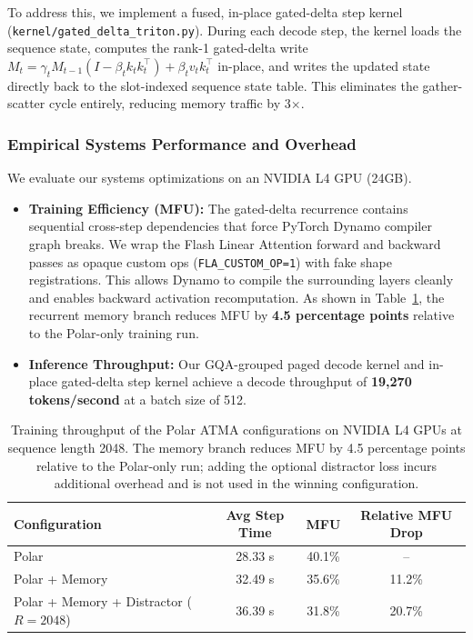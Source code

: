 \documentclass{article} %
\begin{document}
To address this, we implement a fused, in-place gated-delta step kernel (\texttt{kernel/gated\_delta\_triton.py}). During each decode step, the kernel loads the sequence state, computes the rank-1 gated-delta write $M_t = \gamma_t M_{t-1}(I - \beta_t k_t k_t^{\top}) + \beta_t v_t k_t^{\top}$ in-place, and writes the updated state directly back to the slot-indexed sequence state table. This eliminates the gather-scatter cycle entirely, reducing memory traffic by 3$\times$.

\subsubsection{Empirical Systems Performance and Overhead}
We evaluate our systems optimizations on an NVIDIA L4 GPU (24GB).
\begin{itemize}
    \item \textbf{Training Efficiency (MFU):} The gated-delta recurrence contains sequential cross-step dependencies that force PyTorch Dynamo compiler graph breaks. We wrap the Flash Linear Attention forward and backward passes as opaque custom ops (\texttt{FLA\_CUSTOM\_OP=1}) with fake shape registrations. This allows Dynamo to compile the surrounding layers cleanly and enables backward activation recomputation. As shown in Table~\ref{table:mfu_overhead}, the recurrent memory branch reduces MFU by \textbf{4.5 percentage points} relative to the Polar-only training run.
    \item \textbf{Inference Throughput:} Our GQA-grouped paged decode kernel and in-place gated-delta step kernel achieve a decode throughput of \textbf{19,270 tokens/second} at a batch size of 512.
\end{itemize}

\begin{table}[h]
\centering
\small
\setlength{\tabcolsep}{4pt}
\begin{tabular}{lccc}
\toprule
\textbf{Configuration} & \textbf{Avg Step Time} & \textbf{MFU} & \textbf{Relative MFU Drop} \\
\midrule
Polar & 28.33 s & 40.1\% & -- \\
Polar + Memory & 32.49 s & 35.6\% & 11.2\% \\
Polar + Memory + Distractor ($R=2048$) & 36.39 s & 31.8\% & 20.7\% \\
\bottomrule
\end{tabular}
\caption{Training throughput of the Polar ATMA configurations on NVIDIA L4 GPUs at sequence length 2048. The memory branch reduces MFU by 4.5 percentage points relative to the Polar-only run; adding the optional distractor loss incurs additional overhead and is not used in the winning configuration.}
\label{table:mfu_overhead}
\end{table}
\end{document}
